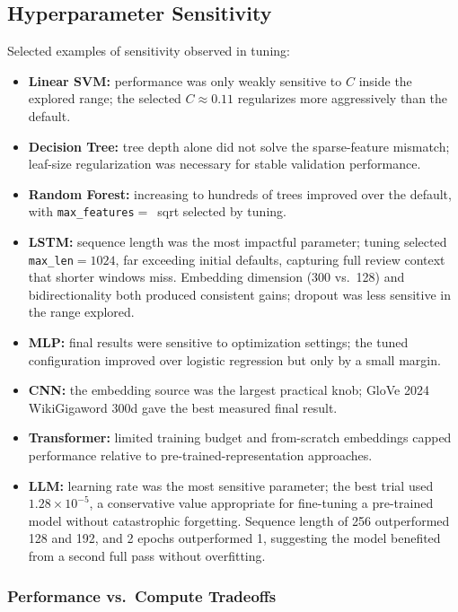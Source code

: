 \documentclass[12pt]{article}
\begin{document}
\subsection{Hyperparameter Sensitivity}
Selected examples of sensitivity observed in tuning:
\begin{itemize}[leftmargin=1.5em, itemsep=0.1em]
    \item \textbf{Linear SVM:} performance was only weakly sensitive to $C$ inside the explored range; the selected $C\approx0.11$ regularizes more aggressively than the default.
    \item \textbf{Decision Tree:} tree depth alone did not solve the sparse-feature mismatch; leaf-size regularization was necessary for stable validation performance.
    \item \textbf{Random Forest:} increasing to hundreds of trees improved over the default, with \texttt{max\_features}$=$\, sqrt selected by tuning.
    \item \textbf{LSTM:} sequence length was the most impactful parameter; tuning selected \texttt{max\_len}$=1024$, far exceeding initial defaults, capturing full review context that shorter windows miss. Embedding dimension (300 vs.\ 128) and bidirectionality both produced consistent gains; dropout was less sensitive in the range explored.
    \item \textbf{MLP:} final results were sensitive to optimization settings; the tuned configuration improved over logistic regression but only by a small margin.
    \item \textbf{CNN:} the embedding source was the largest practical knob; GloVe 2024 WikiGigaword 300d gave the best measured final result.
    \item \textbf{Transformer:} limited training budget and from-scratch embeddings capped performance relative to pre-trained-representation approaches.
    \item \textbf{LLM:} learning rate was the most sensitive parameter; the best trial used $1.28\times10^{-5}$, a conservative value appropriate for fine-tuning a pre-trained model without catastrophic forgetting. Sequence length of 256 outperformed 128 and 192, and 2 epochs outperformed 1, suggesting the model benefited from a second full pass without overfitting.
\end{itemize}
 
\subsubsection{Performance vs.\ Compute Tradeoffs}
 
\end{document}
